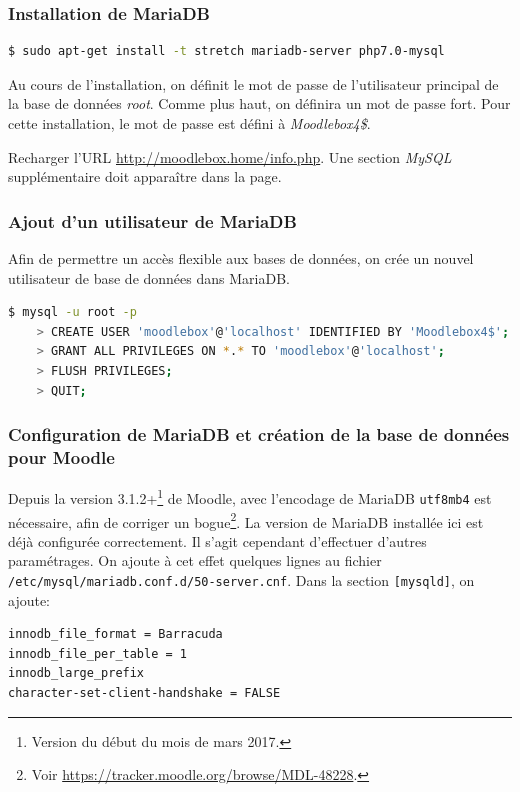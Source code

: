 \documentclass[11pt]{article}
\begin{document}
\subsubsection{Installation de MariaDB}

\begin{lstlisting}[language=bash]
$ sudo apt-get install -t stretch mariadb-server php7.0-mysql
\end{lstlisting}

Au cours de l'installation, on définit le mot de passe de l'utilisateur principal de la base de données \emph{root}. Comme plus haut,  on définira un mot de passe fort. Pour cette installation, le mot de passe est défini à \emph{Moodlebox4\$}.

\begin{verification}
Recharger l'URL \url{http://moodlebox.home/info.php}. Une section \emph{MySQL} supplémentaire doit apparaître dans la page.
\end{verification}

\subsubsection{Ajout d'un utilisateur de MariaDB}

Afin de permettre un accès flexible aux bases de données, on crée un nouvel utilisateur de base de données dans MariaDB.

\begin{lstlisting}[language=bash]
$ mysql -u root -p
    > CREATE USER 'moodlebox'@'localhost' IDENTIFIED BY 'Moodlebox4$';
    > GRANT ALL PRIVILEGES ON *.* TO 'moodlebox'@'localhost';
    > FLUSH PRIVILEGES;
    > QUIT;
\end{lstlisting}

\subsubsection{Configuration de MariaDB et création de la base de données pour Moodle}

Depuis la version 3.1.2+\footnote{Version du début du mois de mars 2017.} de Moodle, avec l'encodage de MariaDB \lstinline{utf8mb4} est nécessaire, afin de corriger un bogue\footnote{Voir \url{https://tracker.moodle.org/browse/MDL-48228}.}. La version de MariaDB installée ici est déjà configurée correctement. Il s'agit cependant d'effectuer d'autres paramétrages. On ajoute à cet effet quelques lignes au fichier \lstinline{/etc/mysql/mariadb.conf.d/50-server.cnf}. Dans la section \lstinline{[mysqld]}, on ajoute:
\begin{lstlisting}[language=bash]
innodb_file_format = Barracuda
innodb_file_per_table = 1
innodb_large_prefix
character-set-client-handshake = FALSE
\end{lstlisting}
\end{document}
